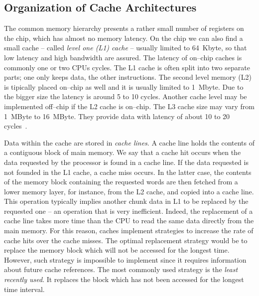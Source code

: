 \subsection{Organization of Cache Architectures}
The common memory hierarchy presents a rather small number of registers on the chip, which has almost no memory latency. On the chip we can also find a small cache -- called \textit{level one (L1) cache} -- usually limited to 64~Kbyte, so that low latency and high bandwidth are assured. The latency of on--chip caches is commonly one or two CPUs cycles. The L1 cache is often split into two separate parts; one only keeps data, the other instructions. The second level memory (L2) is tipically placed on--chip as well and it is usually limited to 1~Mbyte. Due to the bigger size the  latency is around 5 to 10 cycles. Another cache level may be implemented off--chip if the L2 cache is on--chip. The L3 cache size may vary from 1~MByte to 16~MByte. They provide data with latency of about 10 to 20 cycles~\citep{Hennessy-Patterson}.

Data within the cache are stored in \textit{cache lines}. A cache line holds the contents of a contiguous block of main memory. We say that a cache hit occurs when the data requested by the processor is found in a cache line. If the data requested is not founded in the L1 cache, a cache miss occurs. In the latter case, the contents of the memory block containing the requested words are then fetched from a lower memory layer, for instance, from the L2 cache, and copied into a cache line. This operation typically implies another chunk data in L1 to be replaced by the requested one -- an operation that is very inefficient. Indeed, the replacement of a cache line takes more time than the CPU to read the same data directly from the main memory. For this reason, caches implement strategies to increase the rate of cache hits  over the cache misses. The optimal replacement strategy would be to replace the memory block which will not be accessed for the longest time. However, such strategy is impossible to implement since it requires information about future cache references. 
The most commonly used strategy is the \textit{least recently used}. It replaces the block which has not been accessed for the longest time interval.

 

